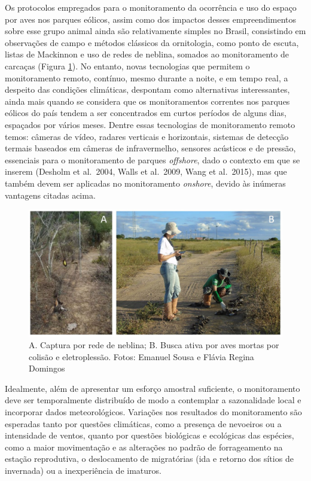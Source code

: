 \documentclass[
  oneside]{scrbook}
\begin{document}
Os protocolos empregados para o monitoramento da ocorrência e uso do espaço por aves nos parques eólicos, assim como dos impactos desses empreendimentos sobre esse grupo animal ainda são relativamente simples no Brasil, consistindo em observações de campo e métodos clássicos da ornitologia, como ponto de escuta, listas de Mackinnon e uso de redes de neblina, somados ao monitoramento de carcaças (Figura \ref{fig:20}). No entanto, novas tecnologias que permitem o monitoramento remoto, contínuo, mesmo durante a noite, e em tempo real, a despeito das condições climáticas, despontam como alternativas interessantes, ainda mais quando se considera que os monitoramentos correntes nos parques eólicos do país tendem a ser concentrados em curtos períodos de alguns dias, espaçados por vários meses. Dentre essas tecnologias de monitoramento remoto temos: câmeras de vídeo, radares verticais e horizontais, sistemas de detecção termais baseados em câmeras de infravermelho, sensores acústicos e de pressão, essenciais para o monitoramento de parques \emph{offshore}, dado o contexto em que se inserem (Desholm et al.~2004, Walls et al.~2009, Wang et al.~2015), mas que também devem ser aplicadas no monitoramento \emph{onshore}, devido às inúmeras vantagens citadas acima.

\begin{figure}[H]

{\centering \includegraphics[width=0.75\linewidth]{imagens/cap06/Figura_6.3ab} 

}

\caption{A. Captura por rede de neblina; B. Busca ativa por aves mortas por colisão e eletroplessão. Fotos: Emanuel Sousa e Flávia Regina Domingos}\label{fig:20}
\end{figure}

Idealmente, além de apresentar um esforço amostral suficiente, o monitoramento deve ser temporalmente distribuído de modo a contemplar a sazonalidade local e incorporar dados meteorológicos. Variações nos resultados do monitoramento são esperadas tanto por questões climáticas, como a presença de nevoeiros ou a intensidade de ventos, quanto por questões biológicas e ecológicas das espécies, como a maior movimentação e as alterações no padrão de forrageamento na estação reprodutiva, o deslocamento de migratórias (ida e retorno dos sítios de invernada) ou a inexperiência de imaturos.
\end{document}

